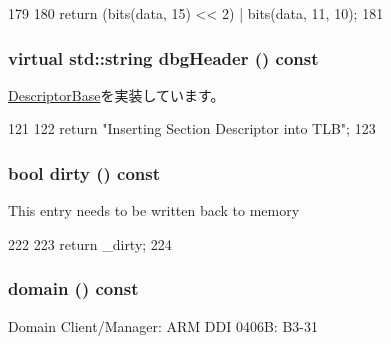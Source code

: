 \begin{DoxyCode}
179         {
180             return (bits(data, 15) << 2) | bits(data, 11, 10);
181         }
\end{DoxyCode}
\hypertarget{classArmISA_1_1TableWalker_1_1L1Descriptor_ac7721f9b49eadf35e0a9f7715a346dbe}{
\subsubsection[{dbgHeader}]{\setlength{\rightskip}{0pt plus 5cm}virtual std::string dbgHeader () const}}
\label{classArmISA_1_1TableWalker_1_1L1Descriptor_ac7721f9b49eadf35e0a9f7715a346dbe}


\hyperlink{classArmISA_1_1TableWalker_1_1DescriptorBase_a16f3fe8786507522f0f0298cb6c414f1}{DescriptorBase}を実装しています。


\begin{DoxyCode}
121         {
122             return "Inserting Section Descriptor into TLB\n";
123         }
\end{DoxyCode}
\hypertarget{classArmISA_1_1TableWalker_1_1L1Descriptor_ade104a269a8f8f3ef5ded192aede7991}{
\subsubsection[{dirty}]{\setlength{\rightskip}{0pt plus 5cm}bool dirty () const}}
\label{classArmISA_1_1TableWalker_1_1L1Descriptor_ade104a269a8f8f3ef5ded192aede7991}
This entry needs to be written back to memory 


\begin{DoxyCode}
222         {
223             return _dirty;
224         }
\end{DoxyCode}
\hypertarget{classArmISA_1_1TableWalker_1_1L1Descriptor_a949a36eac4ce1b6aa2afd933e7e74710}{
\subsubsection[{domain}]{ domain () const}}
\label{classArmISA_1_1TableWalker_1_1L1Descriptor_a949a36eac4ce1b6aa2afd933e7e74710}
Domain Client/Manager: ARM DDI 0406B: B3-\/31 

